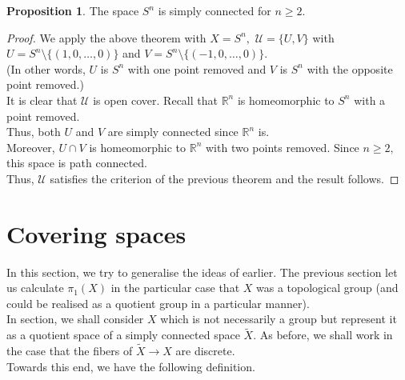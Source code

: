 \documentclass[12pt]{article}
\theoremstyle{definition}
\numberwithin{thm}{section}
\newtheorem{prop}[thm]{Proposition}
\begin{document}
\begin{prop}
	The space $S^n$ is simply connected for $n \ge 2.$
\end{prop}
\begin{proof} 
	We apply the above theorem with $X = S^n,$ $\mathcal{U} = \{U, V\}$ with $U = S^n\setminus\{(1, 0, \ldots, 0)\}$ and $V = S^n\setminus\{(-1, 0, \ldots, 0)\}.$\\
	(In other words, $U$ is $S^n$ with one point removed and $V$ is $S^n$ with the opposite point removed.)\\
	It is clear that $\mathcal{U}$ is open cover. Recall that $\mathbb{R}^n$ is homeomorphic to $S^n$ with a point removed.\\
	Thus, both $U$ and $V$ are simply connected since $\mathbb{R}^n$ is.\\
	Moreover, $U \cap V$ is homeomorphic to $\mathbb{R}^n$ with two points removed. Since $n \ge 2,$ this space is path connected.\\
	Thus, $\mathcal{U}$ satisfies the criterion of the previous theorem and the result follows.
\end{proof}
%
\section{Covering spaces}
%
In this section, we try to generalise the ideas of earlier. The previous section let us calculate $\pi_1(X)$ in the particular case that $X$ was a topological group (and could be realised as a quotient group in a particular manner).\\
In section, we shall consider $X$ which is not necessarily a group but represent it as a quotient space of a simply connected space $\tilde{X}.$ As before, we shall work in the case that the fibers of $\tilde{X} \to X$ are discrete.\\
Towards this end, we have the following definition.
\end{document}
